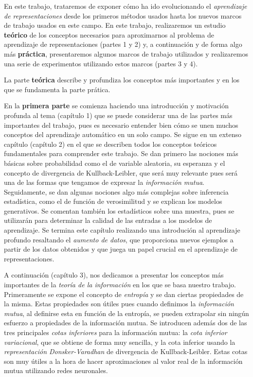 En este trabajo, trataremos de exponer cómo ha ido evolucionando el \emph{aprendizaje de representaciones} desde los primeros métodos usados hasta los nuevos marcos de trabajo usados en este campo. En este trabajo, realizaremos un estudio \textbf{teórico} de los conceptos necesarios para aproximarnos al problema de aprendizaje de representaciones (partes 1 y 2) y, a continuación y de forma algo más \textbf{práctica}, presentaremos algunos marcos de trabajo utilizados y realizaremos una serie de experimentos utilizando estos marcos (partes 3 y 4).

La parte \textbf{teórica} describe y profundiza los conceptos más importantes y en los que se fundamenta la parte prática.

En la \textbf{primera parte} se comienza haciendo una introducción y motivación profunda al tema (capítulo 1) que se puede considerar una de las partes más importantes del trabajo, pues es necesario entender bien cómo se unen muchos conceptos del aprendizaje automático en un solo campo. Se sigue en un extenso capítulo (capítulo 2) en el que se describen todos los conceptos teóricos fundamentales para comprender este trabajo. Se dan primero las nociones más básicas sobre probabilidad como el de variable aleatoria, su esperanza y el concepto de {divergencia de Kullback-Leibler}, que será muy relevante pues será una de las formas que tengamos de expresar la \emph{información mutua}. Seguidamente, se dan algunas nociones algo más complejas sobre inferencia estadística, como el de función de verosimilitud y se explican los modelos generativos. Se comentan también los estadísticos sobre una muestra, pues se utilizarán para determinar la calidad de las entradas a los modelos de aprendizaje. Se termina este capítulo realizando una  introdución al aprendizaje profundo  resaltando el \emph{aumento de datos}, que proporciona nuevos ejemplos a partir de los datos obtenidos y que juega un papel crucial en el aprendizaje de representaciones.

A continuación (capítulo 3), nos dedicamos a presentar  los conceptos más importantes de la \emph{teoría de la información} en los que se basa nuestro trabajo. Primeramente se expone el concepto de  \emph{entropía} y se dan ciertas propiedades de la misma. Estas propiedades son útiles pues cuando definimos la \emph{información mutua}, al definirse esta en función de la entropía, se pueden extrapolar sin ningún esfuerzo a propiedades de la información mutua. Se introducen además dos de las tres principales \emph{cotas inferiores} para la información mutua: la \emph{cota inferior variacional}, que se obtiene de forma muy sencilla, y la cota inferior usando la \emph{representación Donsker-Varadhan} de divergencia de Kullback-Leibler. Estas cotas son muy útiles a la hora de hacer aproximaciones al valor real de la información mutua utilizando redes neuronales.


